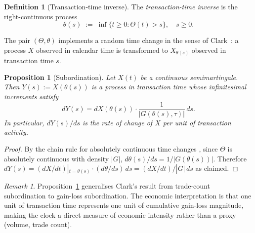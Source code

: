 \documentclass[twocolumn,11pt,a4paper]{article}
\theoremstyle{thmstyle}
\newtheorem{proposition}[theorem]{Proposition}
\theoremstyle{definition}
\newtheorem{definition}[theorem]{Definition}
\theoremstyle{remark}
\newtheorem{remark}[theorem]{Remark}
\newcommand{\Gain}{G}                        %
\newcommand{\Clock}{\Theta}                  %
\newcommand{\InvClock}{\theta}               %
\begin{document}
\begin{definition}[Transaction-time inverse]\label{def:inv-clock}
The \emph{transaction-time inverse} is the right-continuous
process
\begin{equation}\label{eq:inv-clock}
  \InvClock(s) \;:=\; \inf\{t\geq 0 : \Clock(t) > s\},
  \quad s\geq 0.
\end{equation}
\end{definition}

The pair $(\Clock, \InvClock)$ implements a random time
change in the sense of Clark~\citep{Clark1973}: a process
$X$ observed in calendar time is transformed to
$X_{\InvClock(s)}$ observed in transaction time $s$.

\begin{proposition}[Subordination]\label{prop:subordination}
Let $X(t)$ be a continuous semimartingale.  Then
$Y(s):=X(\InvClock(s))$ is a process in transaction time
whose infinitesimal increments satisfy
\begin{equation}\label{eq:subord}
  dY(s) = dX(\InvClock(s)) \cdot
          \frac{1}{|\Gain(\InvClock(s),\tau)|}\,ds.
\end{equation}
In particular, $dY(s)/ds$ is the rate of change of $X$
per unit of transaction activity.
\end{proposition}

\begin{proof}
By the chain rule for absolutely continuous time changes
\citep{KaratzasShreve1991}, since $\Clock$ is absolutely
continuous with density $|\Gain|$,
$d\InvClock(s)/ds = 1/|\Gain(\InvClock(s))|$.  Therefore
$dY(s) = (dX/dt)|_{t=\InvClock(s)}\cdot
(d\InvClock/ds)\,ds
= (dX/dt)/|\Gain|\,ds$ as claimed.
\end{proof}

\begin{remark}\label{rem:clark-connection}
Proposition~\ref{prop:subordination} generalises Clark's
result from trade-count subordination to gain-loss
subordination.  The economic interpretation is that one
unit of transaction time represents one unit of cumulative
gain-loss magnitude, making the clock a direct measure of
economic intensity rather than a proxy (volume, trade count).
\end{remark}
\end{document}
